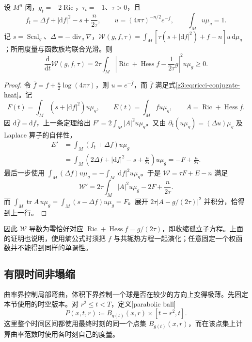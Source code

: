 \begin{theorem}\label{g3:thm:perelman-W-monotonicity}
	设 \(M^n\) 闭，\(g_t=-2\operatorname{Ric}\)，\(\tau_t=-1\)、\(\tau>0\)，且
	\[
		f_t=\Delta f+|\mathrm df|^2-s+\frac n{2\tau},
		\qquad u=(4\pi\tau)^{-n/2}e^{-f},\qquad \int_Mu\mu_g=1.
	\]
	记 \(s=\operatorname{Scal}_g\)、\(\Delta=-\operatorname{div}_g\nabla\)，\(\mathcal W(g,f,\tau)=\int_M[\tau(s+|\mathrm df|^2)+f-n]u\,\mathrm d\mu_g\)；所用度量与函数族均联合光滑。则
	\begin{equation}\label{g3:eq:perelman-W-monotonicity}
		\frac{\mathrm d}{\mathrm dt}\mathcal W(g,f,\tau)
		=2\tau\int_M\left|\operatorname{Ric}+\operatorname{Hess}f-\frac1{2\tau}g\right|^2u\mu_g\ge0.
	\end{equation}
\end{theorem}
\begin{proof}
	令 \(\bar f=f+\frac n2\log(4\pi\tau)\)，则 \(u=e^{-\bar f}\)，而 \(\bar f\) 满足式\eqref{g3:eq:ricci-conjugate-heat}。记
	\[
		F(t)=\int_M(s+|\mathrm df|^2)u\mu_g,
		\qquad E(t)=\int_Mfu\mu_g,
		\qquad A=\operatorname{Ric}+\operatorname{Hess}f.
	\]
	因 \(\mathrm d\bar f=\mathrm df\)，上一条定理给出 \(F'=2\int_M|A|^2u\mu_g\)。又由 \(\partial_t(u\mu_g)=(\Delta u)\mu_g\) 及 Laplace 算子的自伴性，
	\[
		\begin{aligned}
		E'&=\int_M(f_t+\Delta f)u\mu_g\\
		&=\int_M\left(2\Delta f+|\mathrm df|^2-s+\frac n{2\tau}\right)u\mu_g
		=-F+\frac n{2\tau}.
		\end{aligned}
	\]
	最后一步使用 \(\int_M(\Delta f)u\mu_g=-\int_M|\mathrm df|^2u\mu_g\)。于是 \(\mathcal W=\tau F+E-n\) 满足
	\[
		\mathcal W'=2\tau\int_M|A|^2u\mu_g-2F+\frac n{2\tau}.
	\]
	而 \(\int_M\operatorname{tr}A\,u\mu_g=\int_M(s-\Delta f)u\mu_g=F\)。展开 \(2\tau|A-g/(2\tau)|^2\) 并积分，恰得到上一行。
\end{proof}

因此 \(\mathcal W\) 导数为零恰好对应 \(\operatorname{Ric}+\operatorname{Hess}f=g/(2\tau)\)，即收缩孤立子方程。上面的证明也说明，使用熵公式时须把 \(f\) 与共轭热方程一起演化；任意固定一个权函数并不能得到同样的单调性。

\subsection{有限时间非塌缩}
\label{g3:subsec:2704:04}
曲率界控制局部弯曲，体积下界控制一个球是否在较少的方向上变得极薄。先固定本节使用的时空版本。对 \(r^2\le t<T\)，定义[parabolic ball]
\begin{equation}\label{g3:eq:ricci-parabolic-ball}
	P(x,t,r)\coloneqq B_{g(t)}(x,r)\times[t-r^2,t].
\end{equation}
这里整个时间区间都使用最终时刻的同一个点集 \(B_{g(t)}(x,r)\)，而在该点集上计算曲率范数时使用各时刻自己的度量。

